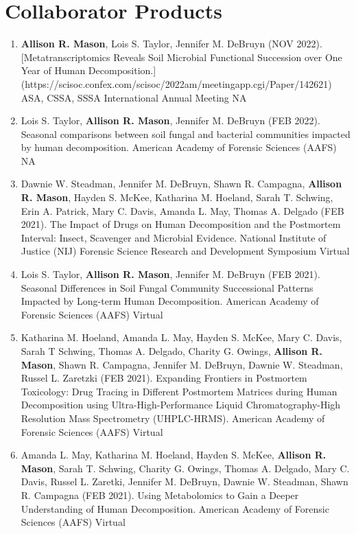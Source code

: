 \documentclass[11pt,a4paper,]{awesome-cv}
\begin{document}
\hypertarget{collaborator-products}{%
\section{\texorpdfstring{\faGroup Collaborator
Products}{Collaborator Products}}\label{collaborator-products}}

\small
\begin{enumerate}
\item \textbf{Allison R. Mason}, Lois S. Taylor, Jennifer M. DeBruyn (NOV 2022). [Metatranscriptomics Reveals Soil Microbial Functional Succession over One Year of Human Decomposition.](https://scisoc.confex.com/scisoc/2022am/meetingapp.cgi/Paper/142621) ASA, CSSA, SSSA International Annual Meeting NA
\item Lois S. Taylor, \textbf{Allison R. Mason}, Jennifer M. DeBruyn (FEB 2022). Seasonal comparisons between soil fungal and bacterial communities impacted by human decomposition. American Academy of Forensic Sciences (AAFS) NA
\item Dawnie W. Steadman, Jennifer M. DeBruyn, Shawn R. Campagna, \textbf{Allison R. Mason}, Hayden S. McKee, Katharina M. Hoeland, Sarah T. Schwing, Erin A. Patrick, Mary C. Davis, Amanda L. May, Thomas A. Delgado (FEB 2021). The Impact of Drugs on Human Decomposition and the Postmortem Interval: Insect, Scavenger and Microbial Evidence. National Institute of Justice (NIJ) Forensic Science Research and Development Symposium Virtual
\item Lois S. Taylor, \textbf{Allison R. Mason}, Jennifer M. DeBruyn (FEB 2021). Seasonal Differences in Soil Fungal Community Successional Patterns Impacted by Long-term Human Decomposition. American Academy of Forensic Sciences (AAFS) Virtual
\item Katharina M. Hoeland, Amanda L. May, Hayden S. McKee, Mary C. Davis, Sarah T Schwing, Thomas A. Delgado, Charity G. Owings, \textbf{Allison R. Mason}, Shawn R. Campagna, Jennifer M. DeBruyn, Dawnie W. Steadman, Russel L. Zaretzki (FEB 2021). Expanding Frontiers in Postmortem Toxicology: Drug Tracing in Different Postmortem Matrices during Human Decomposition using Ultra-High-Performance Liquid Chromatography-High Resolution Mass Spectrometry (UHPLC-HRMS). American Academy of Forensic Sciences (AAFS) Virtual
\item Amanda L. May, Katharina M. Hoeland, Hayden S. McKee, \textbf{Allison R. Mason}, Sarah T. Schwing, Charity G. Owings, Thomas A. Delgado, Mary C. Davis, Russel L. Zaretki, Jennifer M. DeBruyn, Dawnie W. Steadman, Shawn R. Campagna (FEB 2021). Using Metabolomics to Gain a Deeper Understanding of Human Decomposition. American Academy of Forensic Sciences (AAFS) Virtual

\end{enumerate}
\end{document}
